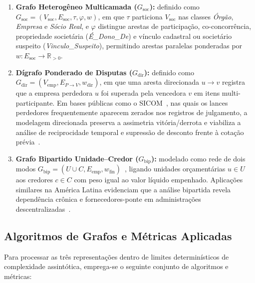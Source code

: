 \begin{enumerate}
  \item \textbf{Grafo Heterogêneo Multicamada ($G_{\text{soc}}$):} definido como $G_{\text{soc}} = (V_{\text{soc}}, E_{\text{soc}}, \tau, \varphi, w)$, em que $\tau$ particiona $V_{\text{soc}}$ nas classes \textit{Órgão}, \textit{Empresa} e \textit{Sócio Real}, e $\varphi$ distingue arestas de participação, co-concorrência, propriedade societária (\textit{É\_Dono\_De}) e vínculo cadastral ou societário suspeito (\textit{Vinculo\_Suspeito}), permitindo arestas paralelas ponderadas por $w: E_{\text{soc}} \to \mathbb{R}_{>0}$.
  \item \textbf{Dígrafo Ponderado de Disputas ($G_{\text{dir}}$):} definido como $G_{\text{dir}} = (V_{\text{emp}}, E_{P \to V}, w_{\text{dir}})$, em que uma aresta direcionada $u \to v$ registra que a empresa perdedora $u$ foi superada pela vencedora $v$ em itens multi-participante. Em bases públicas como o SICOM~\cite{tcemg2025in01}, nas quais os lances perdedores frequentemente aparecem zerados nos registros de julgamento, a modelagem direcionada preserva a assimetria vitória/derrota e viabiliza a análise de reciprocidade temporal e supressão de desconto frente à cotação prévia~\cite{imhof2021detecting,wachs2019cartel}.
  \item \textbf{Grafo Bipartido Unidade--Credor ($G_{\text{bip}}$):} modelado como rede de dois modos $G_{\text{bip}} = (U \cup C, E_{\text{emp}}, w_{\text{fin}})$~\cite{borgatti1997network}, ligando unidades orçamentárias $u \in U$ aos credores $c \in C$ com peso igual ao valor líquido empenhado. Aplicações similares na América Latina evidenciam que a análise bipartida revela dependência crônica e fornecedores-ponte em administrações descentralizadas~\cite{herrera2020characterization,alcazar2026supplier}.
\end{enumerate}

\subsection{Algoritmos de Grafos e Métricas Aplicadas}

Para processar as três representações dentro de limites determinísticos de complexidade assintótica, emprega-se o seguinte conjunto de algoritmos e métricas:

